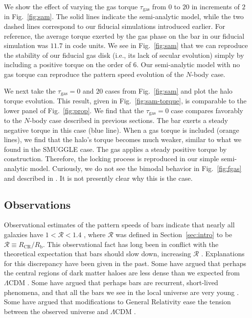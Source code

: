 \documentclass[twocolumn,linenumbers,trackchanges]{aastex631}
\newcommand{\RCR}{\ensuremath{R_{\textrm{CR}}}}
\newcommand{\Rot}{\ensuremath{\mathcal{R}}}
\newcommand{\Rb}{\ensuremath{R_{\textrm{b}}}}
\newcommand{\Nbody}{$N$-body}
\newcommand{\SMUGGLE}{SMUGGLE}
\begin{document}
We show the effect of varying the gas torque $\tau_{\textrm{gas}}$ from $0$ to
$20$ in increments of $2$ in Fig.~\ref{fig:sam}. The solid lines indicate the
semi-analytic model, while the two dashed lines correspond to our fiducial
simulations introduced earlier. For reference, the average torque exerted by the
gas phase on the bar in our fiducial simulation was $11.7$ in code units. We see
in Fig.~\ref{fig:sam} that we can reproduce the stability of our fiducial gas
disk (i.e., its lack of secular evolution) simply by including a positive torque
on the order of $6$. Our semi-analytic model with no gas torque can reproduce
the pattern speed evolution of the $N$-body case.

We next take the $\tau_{\textrm{gas}}=0$ and $20$ cases from Fig.~\ref{fig:sam}
and plot the halo torque evolution. This result, given in
Fig.~\ref{fig:sam-torque}, is comparable to the lower panel of
Fig.~\ref{fig:prop}. We find that the $\tau_{\textrm{gas}}=0$ case compares
favorably to the \Nbody{} case described in previous sections. The bar exerts a
steady negative torque in this case (blue line). When a gas torque is included
(orange lines), we find that the halo's torque becomes much weaker, similar to
what we found in the \SMUGGLE{} case. The gas applies a steady positive torque
by construction. Therefore, the locking process is reproduced in our simple
semi-analytic model. Curiously, we do not see the bimodal behavior in
Fig.~\ref{fig:fgas} and described in \citet{2010ApJ...719.1470V}. It is not
presently clear why this is the case.

\subsection{Observations}
\label{ssec:observations}
Observational estimates of the pattern speeds of bars indicate that nearly all
galaxies have $1 < \Rot < 1.4$ \citep{2011MSAIS..18...23C, 2015AA...576A.102A,
2019MNRAS.482.1733G, 2020MNRAS.491.3655G}, where $\Rot$ was defined in
Section~\ref{sec:intro} to be $\Rot\equiv \RCR/\Rb$. This observational fact has
long been in conflict with the theoretical expectation that bars should slow
down, increasing \Rot{} \citep[e.g.][]{1984MNRAS.209..729T, 1985MNRAS.213..451W,
2000ApJ...543..704D}. Explanations for this discrepancy have been given in the
past. Some have argued that perhaps the central regions of dark matter haloes
are less dense than we expected from $\Lambda\textrm{CDM}$
\citep[e.g.][]{2000ApJ...543..704D,2021AA...650L..16F}. Some have argued that
perhaps bars are recurrent, short-lived phenomena, and that all the bars we see
in the local universe are very young \citep{2002AA...392...83B,
2005MNRAS.364L..18B}. Some have argued that modifications to General Relativity
ease the tension between the observed universe and $\Lambda\textrm{CDM}$
\citep[e.g.][]{2021MNRAS.503.2833R, 2021MNRAS.508..926R}.
\end{document}
